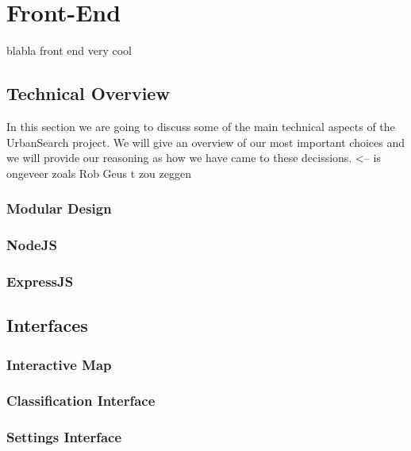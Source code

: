 \section{Front-End}
blabla front end very cool 
\subsection{Technical Overview}
In this section we are going to discuss some of the main technical aspects of the UrbanSearch project. We will give an overview of our most important choices and we will provide our reasoning as how we have came to these decissions. <-- is ongeveer zoals Rob Geus t zou zeggen

\subsubsection{Modular Design}
\subsubsection{NodeJS}
\subsubsection{ExpressJS}


\subsection{Interfaces}
\subsubsection{Interactive Map}
\subsubsection{Classification Interface}
\subsubsection{Settings Interface}
